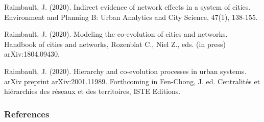 {\smallskip

Raimbault, J. (2020). Indirect evidence of network effects in a system of cities. Environment and Planning B: Urban Analytics and City Science, 47(1), 138-155.
\nocite{raimbault2020indirect}

\smallskip

Raimbault, J. (2020). Modeling the co-evolution of cities and networks. Handbook of cities and networks, Rozenblat C., Niel Z., eds. (in press) arXiv:1804.09430.
\nocite{raimbault2018modeling}

\smallskip

Raimbault, J. (2020). Hierarchy and co-evolution processes in urban systems. arXiv preprint arXiv:2001.11989. Forthcoming in Fen-Chong, J. ed. Centralit{\'e}s et hi{\'e}rarchies des r{\'e}seaux et des territoires, ISTE Editions.
\nocite{raimbault2020hierarchy}

}





\begin{frame}[allowframebreaks]
\frametitle{References}


\end{frame}












